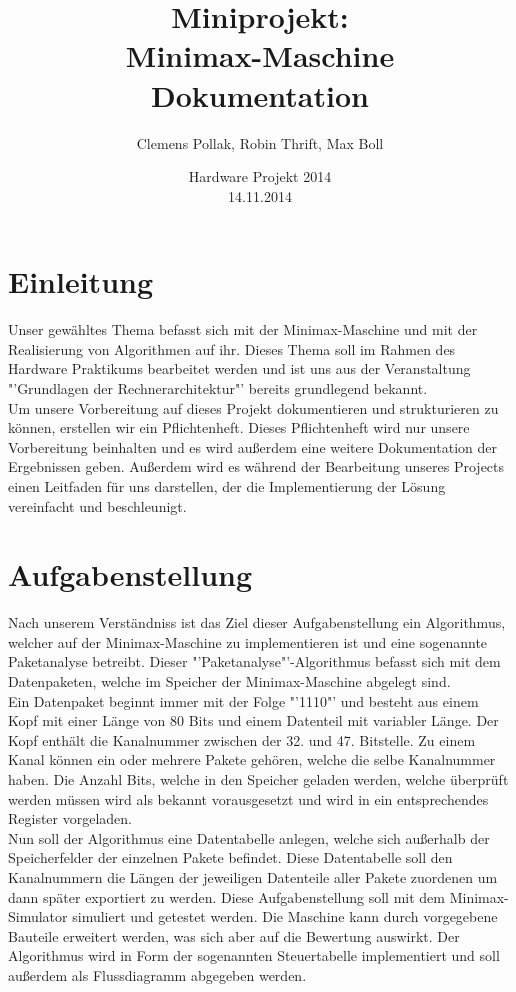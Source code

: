 \documentclass[12pt,titlepage]{article}
\begin{document}
\title{Miniprojekt: \\ Minimax-Maschine \\ Dokumentation}
\author{Clemens Pollak, Robin Thrift, Max Boll}
\date{Hardware Projekt 2014 \\ 14.11.2014}
\maketitle

\tableofcontents

\newpage

\section{Einleitung} 
Unser gew{\"a}hltes Thema befasst sich mit der Minimax-Maschine und mit der Realisierung von Algorithmen auf ihr. Dieses Thema soll im Rahmen des Hardware Praktikums bearbeitet werden und ist uns aus der Veranstaltung "'Grundlagen der Rechnerarchitektur"' bereits grundlegend bekannt.\\ Um unsere Vorbereitung auf dieses Projekt dokumentieren und strukturieren zu k{\"o}nnen, erstellen wir ein Pflichtenheft. Dieses Pflichtenheft wird nur unsere Vorbereitung beinhalten und es wird au{\ss}erdem eine weitere Dokumentation der Ergebnissen geben. Außerdem wird es w{\"a}hrend der Bearbeitung unseres Projects einen Leitfaden für uns darstellen, der die Implementierung der L{\"o}sung vereinfacht und beschleunigt.


\section{Aufgabenstellung}
Nach unserem Verst{\"a}ndniss ist das Ziel dieser Aufgabenstellung ein Algorithmus, welcher auf der Minimax-Maschine zu implementieren ist und eine sogenannte Paketanalyse betreibt. Dieser "'Paketanalyse"'-Algorithmus befasst sich mit dem Datenpaketen, welche im Speicher der Minimax-Maschine abgelegt sind.\\ Ein Datenpaket beginnt immer mit der Folge "'1110"' und besteht aus einem
Kopf mit einer L{\"a}nge von 80 Bits und einem Datenteil mit variabler L{\"a}nge. Der Kopf enth{\"a}lt die Kanalnummer zwischen der 32. und 47. Bitstelle. Zu einem Kanal k{\"o}nnen ein oder mehrere Pakete geh{\"o}ren, welche die selbe Kanalnummer haben.
Die Anzahl Bits, welche in den Speicher geladen werden, welche überprüft werden müssen wird als bekannt vorausgesetzt und wird in ein entsprechendes Register vorgeladen.\\
Nun soll der Algorithmus eine Datentabelle anlegen, welche sich au{\ss}erhalb der Speicherfelder der einzelnen Pakete befindet. Diese Datentabelle soll den Kanalnummern die L{\"a}ngen der jeweiligen Datenteile aller Pakete zuordenen um dann später exportiert zu werden. Diese Aufgabenstellung soll mit dem Minimax-Simulator simuliert und getestet werden. Die Maschine kann durch vorgegebene Bauteile erweitert werden, was sich aber auf die Bewertung auswirkt. Der Algorithmus wird in Form der sogenannten Steuertabelle implementiert und soll außerdem als Flussdiagramm abgegeben werden.
\end{document}

